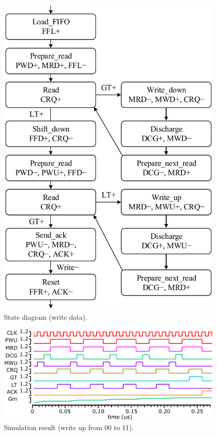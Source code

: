 \documentclass[twocolumn,conference]{IEEEtran}
\begin{document}
\begin{figure}[ht]
    \centering
    \includegraphics[scale=0.5]{figs/StateDiagramWriteV5}
    \caption{State diagram (write data).}
    \label{fig:StateDiagramWrite}
\end{figure}
\begin{figure}[ht]
    \centering
    \includegraphics[scale=0.33]{figs/SimWrite}
    \caption{Simulation result (write up from 00 to 11).}
    \label{fig:SimWrite}
\end{figure}
\end{document}

